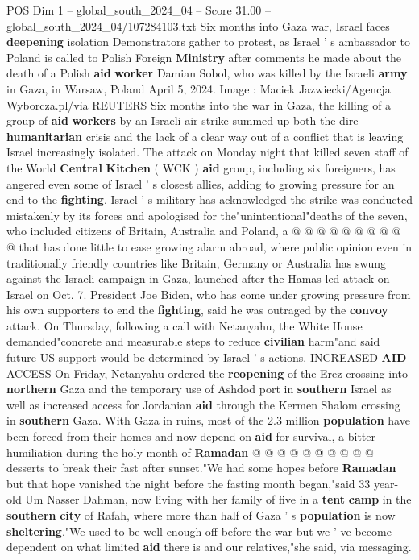 \begin{textsample}{POS Dim 1 – global\_south\_2024\_04 – Score 31.00 – global\_south\_2024\_04/107284103.txt}  \label{ex:f1_pos_146}
Six months into Gaza war, Israel faces \textbf{deepening} isolation Demonstrators gather to protest, as Israel ' s ambassador to Poland is called to Polish Foreign \textbf{Ministry} after comments he made about the death of a Polish \textbf{aid} \textbf{worker} Damian Sobol, who was killed by the Israeli \textbf{army} in Gaza, in Warsaw, Poland April 5, 2024.
Image : Maciek Jazwiecki/Agencja Wyborcza.pl/via REUTERS Six months into the war in Gaza, the killing of a group of \textbf{aid} \textbf{workers} by an Israeli air strike summed up both the dire \textbf{humanitarian} crisis and the lack of a clear way out of a conflict that is leaving Israel increasingly isolated.
The attack on Monday night that killed seven staff of the World \textbf{Central} \textbf{Kitchen} ( WCK ) \textbf{aid} group, including six foreigners, has angered even some of Israel ' s closest allies, adding to growing pressure for an end to the \textbf{fighting}.
Israel ' s military has acknowledged the strike was conducted mistakenly by its forces and apologised for the"unintentional"deaths of the seven, who included citizens of Britain, Australia and Poland, a @ @ @ @ @ @ @ @ @ @ that has done little to ease growing alarm abroad, where public opinion even in traditionally friendly countries like Britain, Germany or Australia has swung against the Israeli campaign in Gaza, launched after the Hamas-led attack on Israel on Oct. 7.
President Joe Biden, who has come under growing pressure from his own supporters to end the \textbf{fighting}, said he was outraged by the \textbf{convoy} attack.
On Thursday, following a call with Netanyahu, the White House demanded"concrete and measurable steps to reduce \textbf{civilian} harm"and said future US support would be determined by Israel ' s actions.
INCREASED \textbf{AID} ACCESS On Friday, Netanyahu ordered the \textbf{reopening} of the Erez crossing into \textbf{northern} Gaza and the temporary use of Ashdod port in \textbf{southern} Israel as well as increased access for Jordanian \textbf{aid} through the Kermen Shalom crossing in \textbf{southern} Gaza.
With Gaza in ruins, most of the 2.3 million \textbf{population} have been forced from their homes and now depend on \textbf{aid} for survival, a bitter humiliation during the holy month of \textbf{Ramadan} @ @ @ @ @ @ @ @ @ @ desserts to break their fast after sunset."We had some hopes before \textbf{Ramadan} but that hope vanished the night before the fasting month began,"said 33 year-old Um Nasser Dahman, now living with her family of five in a \textbf{tent} \textbf{camp} in the \textbf{southern} \textbf{city} of Rafah, where more than half of Gaza ' s \textbf{population} is now \textbf{sheltering}."We used to be well enough off before the war but we ' ve become dependent on what limited \textbf{aid} there is and our relatives,"she said, via messaging.

\end{textsample}
